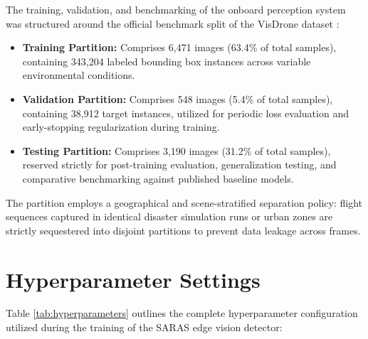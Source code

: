 The training, validation, and benchmarking of the onboard perception system was structured around the official benchmark split of the VisDrone dataset \cite{16}:
\begin{itemize}
    \item \textbf{Training Partition:} Comprises 6,471 images (63.4\% of total samples), containing 343,204 labeled bounding box instances across variable environmental conditions.
    \item \textbf{Validation Partition:} Comprises 548 images (5.4\% of total samples), containing 38,912 target instances, utilized for periodic loss evaluation and early-stopping regularization during training.
    \item \textbf{Testing Partition:} Comprises 3,190 images (31.2\% of total samples), reserved strictly for post-training evaluation, generalization testing, and comparative benchmarking against published baseline models.
\end{itemize}
The partition employs a geographical and scene-stratified separation policy: flight sequences captured in identical disaster simulation runs or urban zones are strictly sequestered into disjoint partitions to prevent data leakage across frames.

\section{Hyperparameter Settings}

Table \ref{tab:hyperparameters} outlines the complete hyperparameter configuration utilized during the training of the SARAS edge vision detector:

